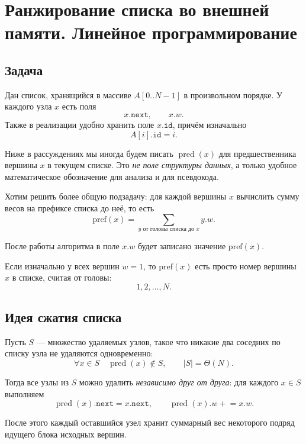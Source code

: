 
	\section{Ранжирование списка во внешней памяти. Линейное программирование}
	
	\subsection{Задача}
	Дан список, хранящийся в массиве $A[0..N-1]$ в произвольном порядке.
	У каждого узла $x$ есть поля
	\[
	x.\texttt{next},
	\qquad
	x.w.
	\]
	Также в реализации удобно хранить поле $x.\texttt{id}$, причём изначально
	\[
	A[i].\texttt{id}=i.
	\]
	
	\medskip
	\noindent
	\begin{Remark}{}{}
		Ниже в рассуждениях мы иногда будем писать $\operatorname{pred}(x)$ для предшественника вершины $x$ в текущем списке.
		Это \emph{не поле структуры данных}, а только удобное математическое обозначение для анализа и для псевдокода.
	\end{Remark}
	
	Хотим решить более общую подзадачу:
	для каждой вершины $x$ вычислить сумму весов на префиксе списка до неё, то есть
	\[
	\mathrm{pref}(x)=\sum_{y \text{ от головы списка до } x} y.w.
	\]
	
	После работы алгоритма в поле $x.w$ будет записано значение $\mathrm{pref}(x)$.
	
	Если изначально у всех вершин $w=1$, то $\mathrm{pref}(x)$ есть просто номер вершины $x$ в списке, считая от головы:
	\[
	1,2,\dots,N.
	\]
	
	\subsection{Идея сжатия списка}
	
	Пусть $S$ --- множество удаляемых узлов, такое что никакие два соседних по списку узла не удаляются одновременно:
	\[
	\forall x\in S\quad \operatorname{pred}(x)\notin S,
	\qquad |S|=\Theta(N).
	\]
	
	Тогда все узлы из $S$ можно удалить \emph{независимо друг от друга}:
	для каждого $x\in S$ выполняем
	\[
	\operatorname{pred}(x).\texttt{next}=x.\texttt{next},
	\qquad
	\operatorname{pred}(x).w \mathrel{+}= x.w.
	\]
	
	После этого каждый оставшийся узел хранит суммарный вес некоторого подряд идущего блока исходных вершин.
	

